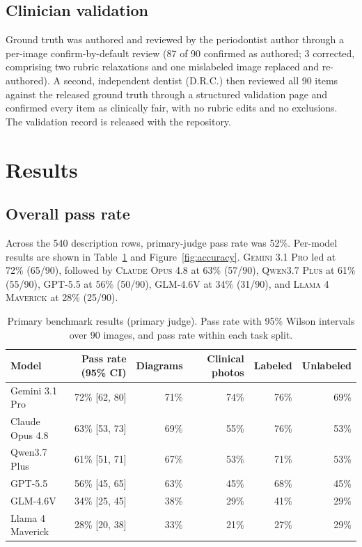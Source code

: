 \documentclass[11pt]{article}
\newcommand{\model}[1]{\textsc{#1}}
\begin{document}
\subsection{Clinician validation}

Ground truth was authored and reviewed by the periodontist author through a per-image confirm-by-default review (87 of 90 confirmed as authored; 3 corrected, comprising two rubric relaxations and one mislabeled image replaced and re-authored). A second, independent dentist (D.R.C.) then reviewed all 90 items against the released ground truth through a structured validation page and confirmed every item as clinically fair, with no rubric edits and no exclusions. The validation record is released with the repository.

\section{Results}

\subsection{Overall pass rate}

Across the 540 description rows, primary-judge pass rate was 52\%. Per-model results are shown in Table~\ref{tab:results} and Figure~\ref{fig:accuracy}. \model{Gemini 3.1 Pro} led at 72\% (65/90), followed by \model{Claude Opus 4.8} at 63\% (57/90), \model{Qwen3.7 Plus} at 61\% (55/90), \model{GPT-5.5} at 56\% (50/90), \model{GLM-4.6V} at 34\% (31/90), and \model{Llama 4 Maverick} at 28\% (25/90).

\begin{table}[t]
\centering
\caption{Primary benchmark results (primary judge). Pass rate with 95\% Wilson intervals over 90 images, and pass rate within each task split.}
\label{tab:results}
\begin{tabular}{lrrrrr}
\toprule
Model & Pass rate (95\% CI) & Diagrams & Clinical photos & Labeled & Unlabeled \\
\midrule
Gemini 3.1 Pro & 72\% [62, 80] & 71\% & 74\% & 76\% & 69\% \\
Claude Opus 4.8 & 63\% [53, 73] & 69\% & 55\% & 76\% & 53\% \\
Qwen3.7 Plus & 61\% [51, 71] & 67\% & 53\% & 71\% & 53\% \\
GPT-5.5 & 56\% [45, 65] & 63\% & 45\% & 68\% & 45\% \\
GLM-4.6V & 34\% [25, 45] & 38\% & 29\% & 41\% & 29\% \\
Llama 4 Maverick & 28\% [20, 38] & 33\% & 21\% & 27\% & 29\% \\
\bottomrule
\end{tabular}
\end{table}
\end{document}
